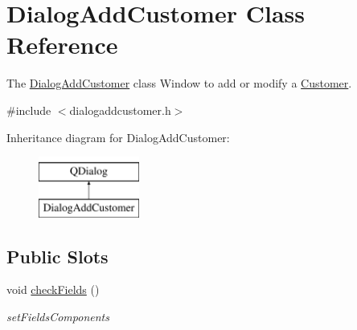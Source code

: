 \hypertarget{classDialogAddCustomer}{\section{Dialog\+Add\+Customer Class Reference}
\label{classDialogAddCustomer}
}


The \hyperlink{classDialogAddCustomer}{Dialog\+Add\+Customer} class Window to add or modify a \hyperlink{classCustomer}{Customer}.  




{\ttfamily \#include $<$dialogaddcustomer.\+h$>$}

Inheritance diagram for Dialog\+Add\+Customer\+:\begin{figure}[H]
\begin{center}
\leavevmode
\includegraphics[height=2.000000cm]{df/d01/classDialogAddCustomer}
\end{center}
\end{figure}
\subsection*{Public Slots}
\begin{DoxyCompactItemize}
\item 
\hypertarget{classDialogAddCustomer_ac4e42b4dc828c57383fe3a9d04685f9c}{void \hyperlink{classDialogAddCustomer_ac4e42b4dc828c57383fe3a9d04685f9c}{check\+Fields} ()}\label{classDialogAddCustomer_ac4e42b4dc828c57383fe3a9d04685f9c}

\begin{DoxyCompactList}\small\item\em set\+Fields\+Components \end{DoxyCompactList}\end{DoxyCompactItemize}
